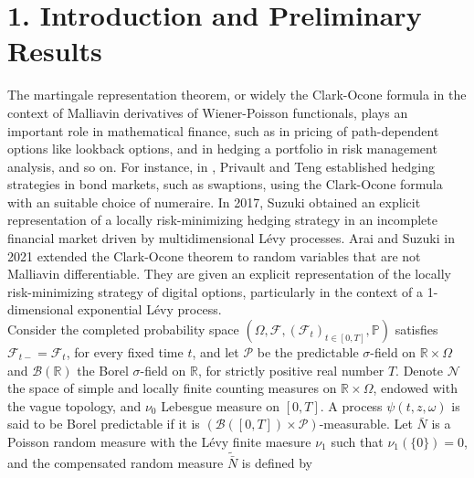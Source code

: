 \documentclass[11pt]{article}
\numberwithin{equation}{section}
\begin{document}
\section*{1. Introduction and Preliminary Results}
The martingale representation theorem, or widely the Clark-Ocone formula in the context of Malliavin derivatives of Wiener-Poisson functionals, plays an important role in mathematical finance, such as in pricing of path-dependent options like lookback options, and in hedging a portfolio in risk management analysis, and so on.  For instance, in \cite{privault}, Privault and Teng established hedging strategies in bond markets, such as swaptions, using the Clark-Ocone formula with an suitable choice of numeraire. In 2017, Suzuki \cite{suzuki} obtained an explicit representation of a locally risk-minimizing hedging strategy in an incomplete financial market driven by multidimensional Lévy processes. Arai and Suzuki in 2021 \cite{arai} extended the Clark-Ocone theorem to random variables that are not Malliavin differentiable. They are given an explicit representation of the locally risk-minimizing strategy of digital options, particularly in the context of a 1-dimensional exponential Lévy process.  \\
Consider the completed probability space $(\Omega, \mathcal{F}, (\mathcal{F}_{t})_{t \in[0, T]}, \mathbb{P})$  satisfies $\mathcal{F}_{t-}=\mathcal{F}_{t}$, for every fixed time $t$, and let $\mathcal{P}$ be the predictable $\sigma$-field on $\mathbb{R} \times \Omega$ and $\mathcal{B}(\mathbb{R})$ the Borel $\sigma$-field on $\mathbb{R}$, for strictly positive real number $T$.
Denote $\mathcal{N}$ the space of simple and locally finite counting measures on $\mathbb{R} \times \Omega$, endowed with the vague topology, and $\nu_0$ Lebesgue measure on $[0, T]$. A process $\psi(t, z, \omega)$ is said to be Borel predictable if it is $( \mathcal{B}({[0, T]}) \times \mathcal{P} )$-measurable. Let $\bar{N}$ is a Poisson random measure with the Lévy finite maesure $\nu_1$ such that $\nu_1(\{0\})=0$, and 
the compensated random measure $\tilde{\bar{N}}$ is defined by
\end{document}
